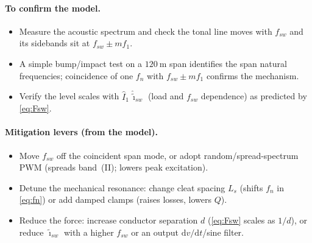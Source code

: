 \documentclass[11pt,a4paper,oneside]{book}
\begin{document}
\begin{onehalfspace}
\begin{appendices}
\paragraph{To confirm the model.}
\begin{itemize}[leftmargin=*,nosep]
	\item Measure the acoustic spectrum and check the tonal line moves with $f_{sw}$
	and its sidebands sit at $f_{sw}\pm m f_1$.
	\item A simple bump/impact test on a $120\ \mathrm{m}$ span identifies the span
	natural frequencies; coincidence of one $f_n$ with $f_{sw}\pm m f_1$ confirms the
	mechanism.
	\item Verify the level scales with $\hat I_1\,\hat{\tilde\imath}_{sw}$ (load and
	$f_{sw}$ dependence) as predicted by \eqref{eq:Fsw}.
\end{itemize}

\paragraph{Mitigation levers (from the model).}
\begin{itemize}[leftmargin=*,nosep]
	\item Move $f_{sw}$ off the coincident span mode, or adopt random/spread-spectrum
	PWM (spreads band~(II); lowers peak excitation).
	\item Detune the mechanical resonance: change cleat spacing $L_s$ (shifts $f_n$ in
	\eqref{eq:fn}) or add damped clamps (raises losses, lowers $Q$).
	\item Reduce the force: increase conductor separation $d$ (\eqref{eq:Fsw} scales as
	$1/d$), or reduce $\hat{\tilde\imath}_{sw}$ with a higher $f_{sw}$ or an output
	$\mathrm{d}v/\mathrm{d}t$/sine filter.
\end{itemize}


\end{appendices}
\end{onehalfspace}
\end{document}
